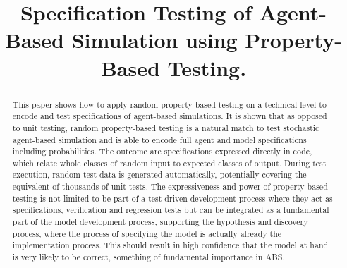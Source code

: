 \documentclass[]{interact}
\theoremstyle{plain}%
\theoremstyle{definition}
\theoremstyle{remark}
\begin{document}

\title{Specification Testing of Agent-Based Simulation using Property-Based Testing.}

\author{
}



\maketitle

\begin{abstract}
This paper shows how to apply random property-based testing on a technical level to encode and test specifications of agent-based simulations. It is shown that as opposed to unit testing, random property-based testing is a natural match to test stochastic agent-based simulation and is able to encode full agent and model specifications including probabilities. The outcome are specifications expressed directly in code, which relate whole classes of random input to expected classes of output. During test execution, random test data is generated automatically, potentially covering the equivalent of thousands of unit tests. The expressiveness and power of property-based testing is not limited to be part of a test driven development process where they act as specifications, verification and regression tests but can be integrated as a fundamental part of the model development process, supporting the hypothesis and discovery process, where the process of specifying the model is actually already the implementation process. This should result in high confidence that the model at hand is very likely to be correct, something of fundamental importance in ABS.
\end{abstract}
\end{document}
